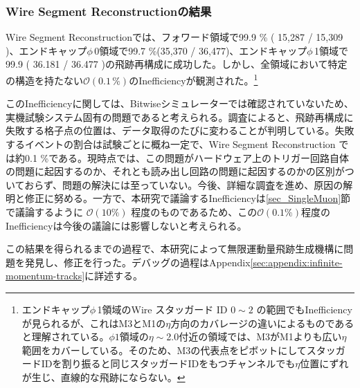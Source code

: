 \subsubsection*{Wire Segment Reconstructionの結果}
Wire Segment Reconstructionでは、フォワード領域で99.9 \% ( 15,287 / 15,309 )、エンドキャップ$\phi\,$0領域で99.7 \%(35,370 / 36,477)、エンドキャップ$\phi\,$1領域で99.9 ( 36.181 / 36.477 )の飛跡再構成に成功した。しかし、全領域において特定の構造を持たない$\mathcal{O}(0.1\,\%)$のInefficiencyが観測された。\footnote{エンドキャップ$\phi\,$1領域のWire スタッガード ID $0 \sim 2$ の範囲でもInefficiencyが見られるが、これはM3とM1の$\eta$方向のカバレージの違いによるものであると理解されている。$\phi1$領域の$\eta\sim$2.0付近の領域では、M3がM1よりも広い$\eta$範囲をカバーしている。そのため、M3の代表点をピボットにしてスタッガードIDを割り振ると同じスタッガードIDをもつチャンネルでも$\eta$位置にずれが生じ、直線的な飛跡にならない。
}

このInefficiencyに関しては、Bitwiseシミュレーターでは確認されていないため、実機試験システム固有の問題であると考えられる。調査によると、飛跡再構成に失敗する格子点の位置は、データ取得のたびに変わることが判明している。失敗するイベントの割合は試験ごとに概ね一定で、Wire Segment Reconstruction では約0.1 \%である。現時点では、この問題がハードウェア上のトリガー回路自体の問題に起因するのか、それとも読み出し回路の問題に起因するのかの区別がついておらず、問題の解決には至っていない。今後、詳細な調査を進め、原因の解明と修正に努める。一方で、本研究で議論するInefficiencyは\ref{sec_SingleMuon}節で議論するように $\mathcal{O}(10 \%)$ 程度のものであるため、この$\mathcal{O}(0.1 \%)$程度のInefficiencyは今後の議論には影響しないと考えられる。

この結果を得られるまでの過程で、本研究によって無限運動量飛跡生成機構に問題を発見し、修正を行った。デバッグの過程はAppendix\ref{sec:appendix:infinite-momentum-tracks}に詳述する。

